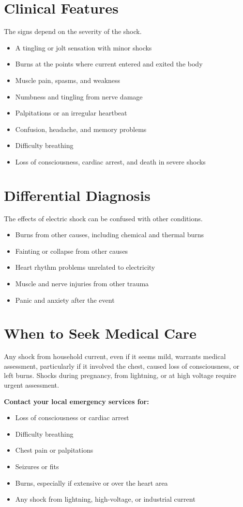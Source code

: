 \section*{Clinical Features}
The signs depend on the severity of the shock.
\begin{itemize}
    \item A tingling or jolt sensation with minor shocks
    \item Burns at the points where current entered and exited the body
    \item Muscle pain, spasms, and weakness
    \item Numbness and tingling from nerve damage
    \item Palpitations or an irregular heartbeat
    \item Confusion, headache, and memory problems
    \item Difficulty breathing
    \item Loss of consciousness, cardiac arrest, and death in severe shocks
\end{itemize}

\section*{Differential Diagnosis}
The effects of electric shock can be confused with other conditions.
\begin{itemize}
    \item Burns from other causes, including chemical and thermal burns
    \item Fainting or collapse from other causes
    \item Heart rhythm problems unrelated to electricity
    \item Muscle and nerve injuries from other trauma
    \item Panic and anxiety after the event
\end{itemize}

\section*{When to Seek Medical Care}
Any shock from household current, even if it seems mild, warrants medical assessment, particularly if it involved the chest, caused loss of consciousness, or left burns. Shocks during pregnancy, from lightning, or at high voltage require urgent assessment.

\textbf{Contact your local emergency services for:}
\begin{itemize}
    \item Loss of consciousness or cardiac arrest
    \item Difficulty breathing
    \item Chest pain or palpitations
    \item Seizures or fits
    \item Burns, especially if extensive or over the heart area
    \item Any shock from lightning, high-voltage, or industrial current
\end{itemize}

